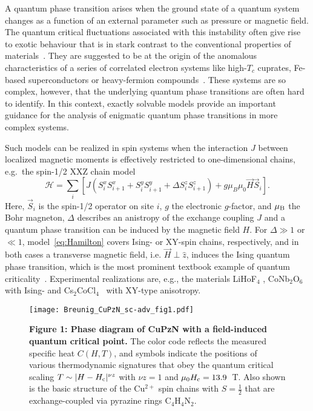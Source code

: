 \documentclass[12pt]{article}
\begin{document}
A quantum phase transition arises when the ground state of a quantum system changes as a function of an external parameter such as pressure or magnetic field. The quantum critical fluctuations associated with this instability often give rise to exotic behaviour that is in stark contrast to the conventional properties of materials~\cite{Lohneysen2007}. They are suggested to be at the origin of the anomalous characteristics of a series of correlated electron systems like high-$T_c$ cuprates, Fe-based superconductors or heavy-fermion compounds~\cite{Sachdev2008,Gegenwart2008,Sachdev2011,Kuo2016,Mazzone2017}. These systems are so complex, however, that the underlying quantum phase transitions are often hard to identify. In this context, exactly solvable models provide an important guidance for the analysis of enigmatic quantum phase transitions in more complex systems.
 
Such models can be realized in spin systems when the interaction $J$ between localized magnetic moments is effectively restricted to one-dimensional chains, e.g.\ the spin-1/2 XXZ chain model 
\begin{equation}
\mathcal{H}= \sum\limits_{i} \left[ J \left(S_i^x S_{i+1}^x + S_i^y S_{i+1}^y + \Delta S_i^z S_{i+1}^z \right) + g\mu_B \mu_0\vec{H} \vec{S}_i \right].
\label{eq:Hamilton}
\end{equation}
%
Here, $\vec S_i$ is the spin-1/2 operator on site $i$, $g$ the electronic $g$-factor, and $\mu_{\rm B}$ the Bohr magneton, $\Delta$ describes an anistropy of the exchange coupling $J$ and a quantum phase transition can be induced by the magnetic field $H$. For $\Delta \gg 1$ or $\ll 1$, model~\eqref{eq:Hamilton} covers Ising- or XY-spin chains, respectively, and in both cases a transverse magnetic field, i.e. $\vec H \perp \hat z$, induces the Ising quantum phase transition, which is the most prominent textbook example of quantum criticality~\cite{Sachdev2001}. Experimental realizations are, e.g., the materials LiHoF$_4$ \cite{Bitko1996}, CoNb$_2$O$_6$ \cite{Coldea2010b} with Ising- and Cs$_2$CoCl$_4$~\cite{Kenzelmann2002a,Breunig2013} with XY-type anisotropy.

\begin{figure}[t]
  \centering
  \texttt{[image: Breunig\_CuPzN\_sc-adv\_fig1.pdf]}  
 \caption{{\bf Figure 1: Phase diagram of CuPzN with a field-induced quantum critical point.} The color code reflects the measured specific heat $C(H,T)$, and symbols indicate the positions of various thermodynamic signatures that obey the quantum critical scaling $T \sim |H-H_{\rm c}|^{\nu z}$ with $\nu z =1$ and $\mu_0 H_{\rm c} = 13.9$~T. Also shown is the basic structure of the Cu$^{2+}$ spin chains with $S=\frac{1}{2}$ that are exchange-coupled via pyrazine rings C$_4$H$_4$N$_2$.
}  
\label{fig1}
\end{figure}
\end{document}
